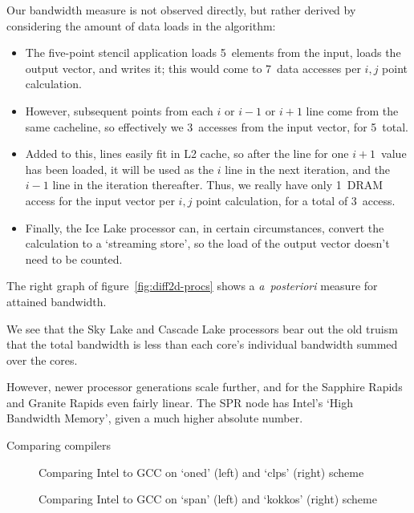 Our bandwidth measure is not observed directly, but
rather derived by considering the amount of data loads
in the algorithm:
\begin{itemize}
\item The five-point stencil application loads 5~elements from the input,
  loads the output vector, and writes it; this would come to 7~data accesses per
  $i,j$ point calculation.
\item However, subsequent points from each $i$ or $i-1$ or $i+1$ line
  come from the same cacheline, so effectively we 3~accesses from the input vector,
  for 5~total.
\item Added to this, lines easily fit in L2 cache, so after the line for one
  $i+1$~value has been loaded, it will be used as the $i$ line
  in the next iteration, and the $i-1$ line in the iteration thereafter.
  Thus, we really have only 1~DRAM access for the input vector per $i,j$ point calculation,
  for a total of 3~access.
\item Finally, the Ice Lake processor can, in certain circumstances,
  convert the calculation to a `streaming store', so the load of the output vector
  doesn't need to be counted.
\end{itemize}

The right graph of figure~\ref{fig:diff2d-procs} shows a \emph{a~posteriori}
measure for attained bandwidth.


We see that the Sky Lake and Cascade Lake processors bear out the
old truism that the total bandwidth is less than 
each core's individual bandwidth summed over the cores.

However, newer processor generations scale further, and
for the Sapphire Rapids and Granite Rapids even fairly linear.
The SPR node has Intel's `High Bandwidth Memory',
given a much higher absolute number.

 {Comparing compilers}

\begin{figure*}[t]
  \begingroup %
  
  
  \endgroup %
  \caption{Comparing Intel to GCC on `oned' (left) and `clps' (right) scheme}
  \label{fig:compiler-compare-oned}
\end{figure*}

\begin{figure*}[t]
  \begingroup %
  
  
  \endgroup %
  \caption{Comparing Intel to GCC on `span' (left) and `kokkos' (right) scheme}
  \label{fig:compiler-compare-span}
\end{figure*}

